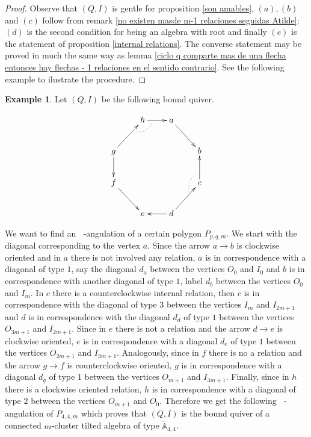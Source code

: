 \documentclass{amsart}
\theoremstyle{plain}
\theoremstyle{definition}
\newtheorem{ejem}[teo]{Example}
\begin{document}
\begin{proof}
Observe that $(Q,I)$ is gentle for proposition \ref{son amables}, $(a),(b)$ and $(c)$ follow from remark \ref{no existen masde m-1 relaciones seguidas Atilde}; $(d)$ is the second condition for being an algebra with root and finally $(e)$ is the statement of proposition \ref{internal relations}.
The converse statement may be proved in much the same way as lemma \ref{ciclo q comparte mas de una flecha entonces hay flechas - 1 relaciones en el sentido contrario}. See the following example to ilustrate the procedure.
\end{proof}

\begin{ejem} Let $(Q,I)$ be the following bound quiver.

\[\xymatrix@R=0.3pc@C=.3pc{  &&& h \ar[rrr] &  \ar@{.}@/^/[lld] && a \ar[rrrddd] &&& \\
&&& &&& &&& \\
&&& &&& &&& \\
g \ar[uuurrr] \ar[ddd] &&&  &&&  &&& b \\
&&& &&& &&& \\
&&& &&& &&&   \\
f  \ar[dddrrr] &&& &&& &&& c \ar[uuu]\\
&&& &&& && \ar@{.}@/^/[ruu] & \\
&&& &&& &&& \\
&&& e &&& d \ar[rrruuu] \ar[lll] &&&}\]

We want to find an ${\mathop{(m+2)}\nolimits}$-angulation of a certain polygon $P_{p,q,m}$. We start with the diagonal corresponding to the vertex $a$. Since the arrow $a\rightarrow b$ is clockwise oriented and in $a$ there is not involved any relation, $a$ is in correspondence with a diagonal of type $1$, say the diagonal $d_a$ between the vertices $O_0$ and $I_0$ and $b$ is in correspondence with another diagonal of type $1$, label  $d_b$ between the vertices $O_0$ and $I_{m}$. In $c$ there is a counterclockwise internal relation, then $c$ is in correspondence with the diagonal of type $3$ between the vertices $I_m$ and $I_{2m+1}$ and $d$ is in correspondence with the diagonal $d_d$ of type $1$ between the vertices $O_{3m+1}$ and $I_{2m+1}$. Since in $e$ there is not a relation and the arrow $d\rightarrow e$ is clockwise oriented, $e$ is in correspondence with a diagonal $d_e$ of type $1$ between the vertices $O_{2m+1}$ and $I_{3m+1}$. Analogously, since  in $f$ there is no a relation and the arrow $g\rightarrow f$ is counterclockwise oriented, $g$ is in correspondence with a diagonal $d_g$ of type $1$ between the vertices $O_{m+1}$ and $I_{3m+1}$. Finally, since in $h$ there is a clockwise oriented relation, $h$ is in correspondence with a diagonal of type $2$ between the vertices $O_{m+1}$ and $O_0$. Therefore we get the following ${\mathop{(m+2)}\nolimits}$-angulation of $P_{4,4,m}$ which proves that $(Q,I)$ is the bound quiver of a connected   $m$-cluster tilted algebra of type $\widetilde{\mathbb{A}}_{4,4}$.


\end{ejem}
\end{document}
